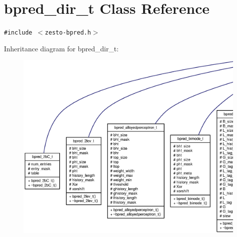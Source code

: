 \section{bpred\_\-dir\_\-t Class Reference}
\label{classbpred__dir__t}
{\tt \#include $<$zesto-bpred.h$>$}

Inheritance diagram for bpred\_\-dir\_\-t:\nopagebreak
\begin{figure}[H]
\begin{center}
\leavevmode
\includegraphics[width=400pt]{classbpred__dir__t__inherit__graph}
\end{center}
\end{figure}
